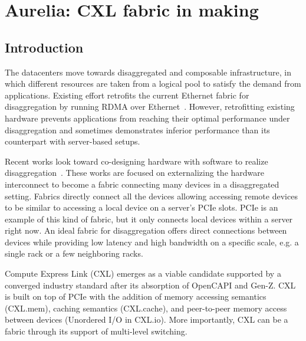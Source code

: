 \chapter{Aurelia: CXL fabric in making}
\label{aurelia:chap}

\section{Introduction}
The datacenters move towards disaggregated and composable infrastructure, in which different resources are taken from a logical pool to satisfy the demand from applications.
%
Existing effort retrofits the current Ethernet fabric for disaggregation by running RDMA over Ethernet~\cite{legoos:osdi:2018, far-memory:eurosys:2020, leap:atc:2020,aifm:osdi:2020,carbink:osdi:2022,hydra:fast:2022,canvas:nsdi:2023}.
%
However, retrofitting existing hardware prevents applications from reaching their optimal performance under disaggregation and sometimes demonstrates inferior performance than its counterpart with server-based setups.

Recent works look toward co-designing hardware with software to realize disaggregation~\cite{kona:asplos:2021, intel-cxl:ieee-micro:2023, tpp:asplos:2023, pond:asplos:2023}.
%
These works are focused on externalizing the hardware interconnect to become a fabric connecting many devices in a disaggregated setting.
%
Fabrics directly connect all the devices allowing accessing remote devices to be similar to accessing a local device on a server's PCIe slots.  
%
PCIe is an example of this kind of fabric, but it only connects local devices within a server right now.
%
%
%
An ideal fabric for disaggregation offers direct connections between devices while providing low latency and high bandwidth on a specific scale, e.g. a single rack or a few neighboring racks.

Compute Express Link (CXL) emerges as a viable candidate supported by a converged industry standard after its absorption of OpenCAPI and Gen-Z. 
%
CXL is built on top of PCIe with the addition of memory accessing semantics (CXL.mem), caching semantics (CXL.cache), and peer-to-peer memory access between devices (Unordered I/O in CXL.io). 
%
%
More importantly, CXL can be a fabric through its support of multi-level switching.

